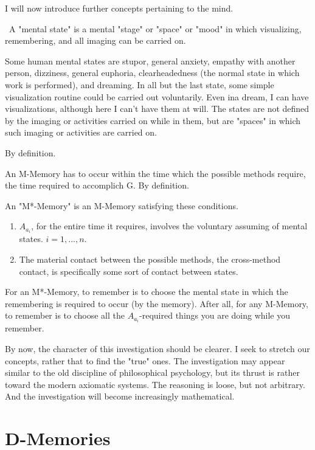 I will now introduce further concepts pertaining to the mind. 

\ A "mental state" is a mental "stage" or "space" or "mood" 
in which visualizing, remembering, and all imaging can be carried on. 

Some human mental states are stupor, general anxiety, empathy with 
another person, dizziness, general euphoria, clearheadedness (the normal 
state in which work is performed), and dreaming. In all but the last state, 
some simple visualization routine could be carried out voluntarily. Even ina 
dream, I can have visualizations, although here I can't have them at will. The 
states are not defined by the imaging or activities carried on while in them, 
but are "spaces" in which such imaging or activities are carried on. 

By definition. 

 An M-Memory has to occur within the time which the 
possible methods require, the time required to accomplich G. By definition. 

 An "M*-Memory" is an M-Memory satisfying these 
conditions. 
\begin{enumerate}
\item $A_{a_i}$, for the entire time it requires, involves the voluntary 
assuming of mental states. $i=1,...,n$.
\item The material contact between the 
possible methods, the cross-method contact, is specifically some sort of 
contact between states. 
\end{enumerate}

 For an M*-Memory, to remember is to choose the 
mental state in which the remembering is required to occur (by the 
memory). After all, for any M-Memory, to remember is to choose all the 
$A_{a_i}$-required things you are doing while you remember. 

By now, the character of this investigation should be clearer. I seek to 
stretch our concepts, rather that to find the "true" ones. The investigation 
may appear similar to the old discipline of philosophical psychology, but its 
thrust is rather toward the modern axiomatic systems. The reasoning is 
loose, but not arbitrary. And the investigation will become increasingly 
mathematical. 


\section{D-Memories}


